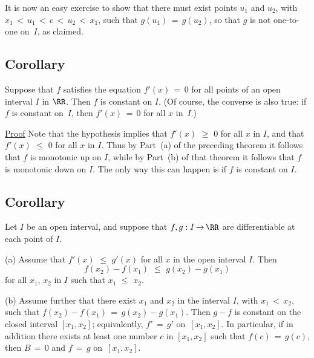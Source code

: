         It is now an easy exercise to show that there must exist points $u_{1}$ and $u_{2}$, with $x_{1}\,<\,u_{1}\,<\,c\,<\,u_{2}\,<\,x_{1}$,
    such that $g(u_{1}) \,=\, g(u_{2})$, so that $g$ is not one-to-one on~$I$, as claimed. \Q 


\V

            \subsection{\small{\bf Corollary}}
            \label{CorE40.50}

\V

        Suppose that $f$ satisfies the equation $f'(x) \,=\, 0$ for all points of an open interval $I$ in ${\RR}$. Then $f$ is constant on $I$.
    (Of course, the converse is also true: if $f$ is constant on~$I$, then $f'(x) \,=\, 0$ for all $x$ in~$I$.)

\V

        \underline{Proof} Note that the hypothesis implies that $f'(x)\,\,{\geq}\,\,0$ for all $x$ in $I$,
    and that $f'(x)\,\,{\leq}\,\,0$ for all $x$ in $I$.
    Thus by Part~(a) of the preceding theorem it follows that $f$ is monotonic up on $I$,
    while by Part~(b) of that theorem it follows that $f$ is monotonic down on $I$. The only way this can happen is if $f$ is constant on $I$. \Q

\V

            \subsection{\small{\bf Corollary}}
            \label{CorE40.65}

\V

        Let $I$ be an open interval, and suppose that $f,g:I \,{\rightarrow}\, {\RR}$ are differentiable at each point of $I$.

\V

        (a) Assume that $f'(x)\,\,{\leq}\,\,g'(x)$ for all $x$ in the open interval $I$. Then
        \begin{displaymath}
        f(x_{2})-f(x_{1})\,\,{\leq}\,\,g(x_{2})-g(x_{1})
        \end{displaymath}
    for all $x_{1}$, $x_{2}$ in $I$ such that $x_{1}\,\,{\leq}\,\,x_{2}$.

\V

        (b) Assume further that there exist $x_{1}$ and $x_{2}$ in the interval $I$, with $x_{1}\,<\,x_{2}$,
    such that $f(x_{2})-f(x_{1}) \,=\, g(x_{2})-g(x_{1})$. Then $g - f$ is constant on the closed interval $[x_{1},x_{2}]$;
    equivalently, $f' \,=\, g'$ on~$[x_{1},x_{2}]$. In particular, if in addition there exists at least one number $c$ in $[x_{1},x_{2}]$
    such that $f(c) \,=\, g(c)$, then $B \,=\, 0$ and $f \,=\, g$ on~$[x_{1},x_{2}]$.

